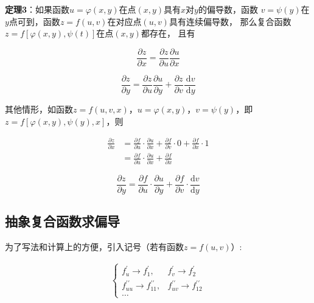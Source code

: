 \documentclass[12pt, a4paper]{article}
\numberwithin{equation}{section}
\newcommand{\rmd}{\mathrm{d}}
\newcommand{\deriv}[2]{\frac{\rmd #1}{\rmd #2}}
\begin{document}
    \textbf{定理3}：如果函数\(u=\varphi\left(x,y\right)\)在点\(\left(x,y\right)\)具有\(x\)对\(y\)的偏导数，函数
    \(v=\psi\left(y\right)\)在\(y\)点可到，函数\(z=f\left(u,v\right)\)在对应点\(\left(u,v\right)\)具有连续偏导数，
    那么复合函数\(z=f\left[\varphi\left(x,y\right), \psi\left(t\right)\right]\)在点\(\left(x,y\right)\)都存在，
    且有

    \begin{equation}
        \frac{\partial z}{\partial x}=\frac{\partial z}{\partial u} \frac{\partial u}{\partial x}
    \end{equation}

    \begin{equation}
        \frac{\partial z}{\partial y}=\frac{\partial z}{\partial u} \frac{\partial u}{\partial y}+\frac{\partial z}{\partial v} \frac{\mathrm{~d} v}{\mathrm{~d} y}
    \end{equation}

    其他情形，如函数\(z=f\left(u, v, x\right)\)，\(u=\varphi\left(x,y\right)\)，\(v=\psi\left(y\right)\)，即
    \(z=f\left[\varphi\left(x,y\right), \psi\left(y\right), x\right]\)，则

    \begin{equation}
        \begin{aligned}
            \frac{\partial z}{\partial x} & =\frac{\partial f}{\partial u} \cdot \frac{\partial u}{\partial x}+
            \frac{\partial f}{\partial v} \cdot 0+\frac{\partial f}{\partial x} \cdot 1 \\
            & =\frac{\partial f}{\partial u} \cdot \frac{\partial u}{\partial x}+\frac{\partial f}{\partial x}
        \end{aligned}
    \end{equation}

    \begin{equation}
        \frac{\partial z}{\partial y}=\frac{\partial f}{\partial u} \cdot \frac{\partial u}{\partial y}+\frac{\partial f}{\partial v} \cdot \deriv{v}{y}
    \end{equation}

\subsection{抽象复合函数求偏导}

    为了写法和计算上的方便，引入记号（若有函数\(z=f\left(u,v\right)\)）:

    $$
        \begin{aligned}
            \left\{\begin{array}{ll}
                f_u^{\prime} \rightarrow f_1^{\prime}, &f_v^{\prime} \rightarrow f_2^{\prime} \\
                f_{u u}^{\prime \prime} \rightarrow f_{11}^{\prime \prime}, &f_{u v}^{\prime \prime} \rightarrow f_{12}^{\prime \prime} \\
                \ldots
            \end{array}\right.
        \end{aligned}
    $$
\end{document}
